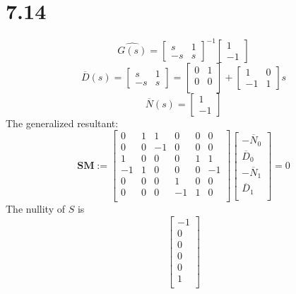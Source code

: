 \documentclass{article}
\begin{document}
\section*{7.14}
\[\hat{G(s)}=
\left[
    \begin{array}{cc}
        s & 1\\
        -s & s
    \end{array}
\right]^{-1}
\left[
    \begin{array}{c}
        1\\
        -1
    \end{array}
\right]
\]
\[
\overline{D}(s)=
\left[
    \begin{array}{cc}
        s & 1\\
        -s & s
    \end{array}
\right]=
\left[
    \begin{array}{cc}
        0 & 1\\
        0 & 0\\
    \end{array}
\right]+
\left[
    \begin{array}{cc}
        1 & 0\\
        -1 & 1
    \end{array}
\right]s
\]
\[
\overline{N}(s)=\left[
    \begin{array}{c}
        1\\
        -1
    \end{array}
\right]
\]
The generalized resultant:
\[
\textbf{SM}:=
\left[
    \begin{array}{cccccc}
    0 & 1 & 1 & 0 & 0 & 0 \\
    0  & 0  & -1& 0 & 0 & 0 \\
    1  & 0  & 0 & 0 & 1 & 1 \\
    -1  & 1  & 0 & 0 & 0 & -1\\
    0  & 0 & 0 & 1 & 0 &0 \\
    0 & 0 &0 & -1 & 1 & 0\\
    \end{array}
\right]
\left[
    \begin{array}{c}
        -\overline{N}_0\\
        \overline{D}_0\\
        -\overline{N}_1\\
        \overline{D}_1\\
    \end{array}
\right]=0
\]
The nullity of $S$ is 
\[
\left[
    \begin{array}{c}
        -1\\
        0\\
        0\\
        0 \\
        0\\
        1\\
    \end{array}
\right]    
\]
\end{document}
